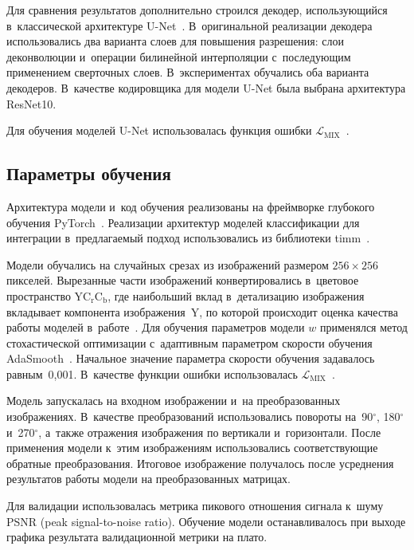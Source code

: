 \begin{multicols}{2}
Для сравнения результатов дополнительно строился декодер, использующийся 
в~классической архитектуре U-Net~\cite{UNET_ORIGINAL}. В~оригинальной реализации 
декодера использовались два варианта слоев для повышения разрешения: слои 
деконволюции и~операции билинейной интерполяции с~последующим применением 
сверточных слоев. В~экспериментах обучались оба варианта декодеров. В~качестве 
кодировщика для модели U-Net была выбрана архитектура ResNet10.

Для обучения моделей U-Net использовалась функция ошибки 
$\mathcal{L}_{\mathrm{MIX}}$~\cite{MIX_LOSS}.

\subsection{Параметры обучения}

Архитектура модели и~код обучения реализованы на фреймворке глубокого обучения 
PyTorch~\cite{PYTORCH_LIB}. Реализации архитектур моделей классификации для 
интеграции в~предлагаемый подход использовались из библиотеки 
timm~\cite{TIMMLIB}.

Модели обучались на случайных срезах из изоб\-ра\-же\-ний размером $256 \times 256$ 
пикселей. Вырезанные части изображений конвертировались в~цветовое пространство 
YC$_{\mathrm{r}}$C$_{\mathrm{b}}$, где наибольший вклад в~детализацию изображения вкладывает компонента 
изображения~Y, по которой происходит оценка качества работы моделей 
в~работе~\cite{UFORMER}. Для обучения параметров модели ${w}$ 
применялся метод стохастической оптимизации с~адаптивным параметром скорости 
обучения AdaSmooth~\cite{ADASMOOTH}. Начальное значение параметра ско\-рости 
обучения задавалось равным~0,001. В~качестве функции ошибки использовалась 
$\mathcal{L}_{\mathrm{MIX}}$~\cite{MIX_LOSS}.

Модель запускалась на входном изображении и~на преобразованных изображениях. 
В~качестве преобразований использовались повороты на~90$^\circ$, 180$^\circ$ и~270$^\circ$, 
а~также отражения изображения по вертикали и~горизонтали. После применения модели к~этим изображениям использовались соответствующие обратные преобразования. 
Итоговое изображение получалось после усреднения результатов работы модели на 
преобразованных матрицах.

Для валидации использовалась метрика пикового отношения сигнала к~шуму PSNR (peak signal-to-noise ratio). 
Обучение модели останавливалось при выходе графика результата валидационной 
метрики на плато.

\begin{figure*}[b] %
\vspace*{1pt}
      \begin{center}
     \mbox{%
\epsfxsize=134.1mm 
}
\end{center}
\vspace*{-9pt}
    \label{fig:wavelets_prediction}
\end{figure*}


\end{multicols}
